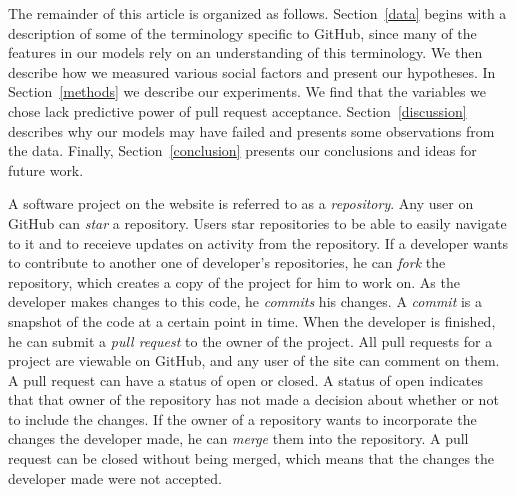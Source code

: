 \documentclass{iitthesis}
\begin{document}
The remainder of this article is organized as follows.
Section~\ref{data} begins with a description of some of the terminology specific
to GitHub, since many of the features in our models rely on an understanding of
this terminology. We then describe how we measured various social factors and
present our hypotheses. In Section~\ref{methods} we describe our experiments. We
find that the variables we chose lack predictive power of pull request
acceptance. Section~\ref{discussion} describes why our models may have failed
and presents some observations from the data. Finally, Section~\ref{conclusion}
presents our conclusions and ideas for future work.


 \label{sec:terms}
A software project on the website is referred to as a \textit{repository}. Any
user on GitHub can \textit{star} a repository. Users star repositories to be
able to easily navigate to it and to receieve updates on activity from the
repository. If a developer wants to contribute to another one of developer's
repositories, he can \textit{fork} the repository, which creates a copy of the
project for him to work on. As the developer makes changes to this code, he
\textit{commits} his changes. A \textit{commit} is a snapshot of the code at a
certain point in time. When the developer is finished, he can submit a
\textit{pull request} to the owner of the project. All pull requests for a
project are viewable on GitHub, and any user of the site can comment on them. A
pull request can have a status of open or closed. A status of open indicates
that that owner of the repository has not made a decision about whether or not
to include the changes. If the owner of a repository wants to incorporate the
changes the developer made, he can \textit{merge} them into the repository. A
pull request can be closed without being merged, which means that the changes
the developer made were not accepted.
\end{document}
